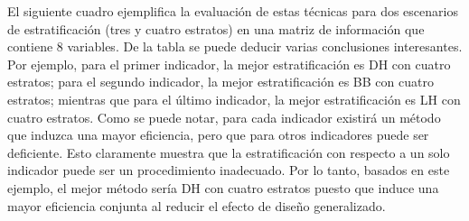 \documentclass[12pt,spanish,]{book}
\begin{document}
El siguiente cuadro ejemplifica la evaluación de estas técnicas para dos escenarios de estratificación (tres y cuatro estratos) en una matriz de información que contiene 8 variables. De la tabla se puede deducir varias conclusiones interesantes. Por ejemplo, para el primer indicador, la mejor estratificación es DH con cuatro estratos; para el segundo indicador, la mejor estratificación es BB con cuatro estratos; mientras que para el último indicador, la mejor estratificación es LH con cuatro estratos. Como se puede notar, para cada indicador existirá un método que induzca una mayor eficiencia, pero que para otros indicadores puede ser deficiente. Esto claramente muestra que la estratificación con respecto a un solo indicador puede ser un procedimiento inadecuado. Por lo tanto, basados en este ejemplo, el mejor método sería DH con cuatro estratos puesto que induce una mayor eficiencia conjunta al reducir el efecto de diseño generalizado.

\footnotesize
\end{document}
